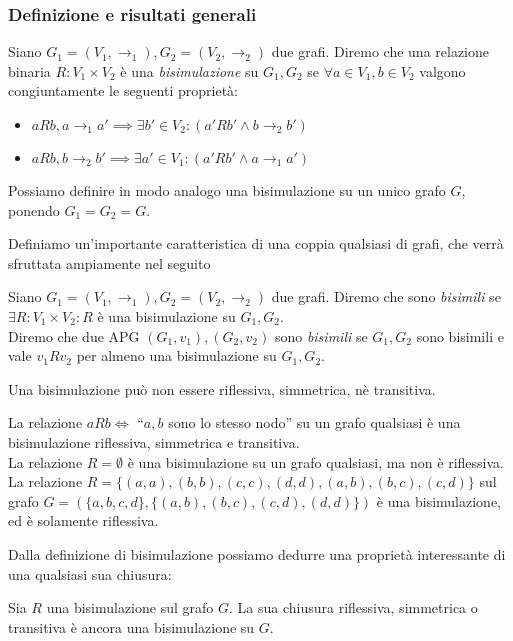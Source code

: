 \subsubsection{Definizione e risultati generali}
\begin{definition}
    Siano $G_1 = (V_1,\to_1), G_2 = (V_2,\to_2)$ due grafi. Diremo che una relazione binaria $R: V_1 \times V_2$ è una \emph{bisimulazione} su $G_1, G_2$ se $\forall a \in V_1, b \in V_2$ valgono congiuntamente le seguenti proprietà:
    \begin{itemize}
        \item $a R b, a \to_1 a' \implies \exists b' \in V_2 : (a' R b' \land b \to_2 b')$
        \item $a R b, b \to_2 b' \implies \exists a' \in V_1 : (a' R b' \land a \to_1 a')$
    \end{itemize}
    Possiamo definire in modo analogo una bisimulazione su un unico grafo $G$, ponendo $G_1 = G_2 = G$.
\end{definition}
Definiamo un'importante caratteristica di una coppia qualsiasi di grafi, che verrà sfruttata ampiamente nel seguito
\begin{definition}
    Siano $G_1 = (V_1,\to_1), G_2 = (V_2,\to_2)$ due grafi. Diremo che sono \emph{bisimili} se $\exists R: V_1 \times V_2 : R$ è una bisimulazione su $G_1, G_2$.\\
    Diremo che due APG $(G_1, v_1), (G_2, v_2)$ sono \emph{bisimili} se $G_1, G_2$ sono bisimili e vale $v_1 R v_2$ per almeno una bisimulazione su $G_1, G_2$.
\end{definition}
\begin{observation}
    Una bisimulazione può non essere riflessiva, simmetrica, nè transitiva.
\end{observation}
\begin{example}
    La relazione $a R b \iff$ ``$a,b$ sono lo stesso nodo'' su un grafo qualsiasi è una bisimulazione riflessiva, simmetrica e transitiva.\\
    La relazione $R = \emptyset$ è una bisimulazione su un grafo qualsiasi, ma non è riflessiva.\\
    La relazione $R = \{(a,a),(b,b),(c,c),(d,d),(a,b),(b,c),(c,d)\}$ sul grafo $G = (\{a,b,c,d\}, \{(a,b),(b,c),(c,d),(d,d)\})$ è una bisimulazione, ed è solamente riflessiva.
\end{example}
Dalla definizione di bisimulazione possiamo dedurre una proprietà interessante di una qualsiasi sua chiusura:
\begin{theorem}
    Sia $R$ una bisimulazione sul grafo $G$. La sua chiusura riflessiva, simmetrica o transitiva è ancora una bisimulazione su $G$.
\end{theorem}
